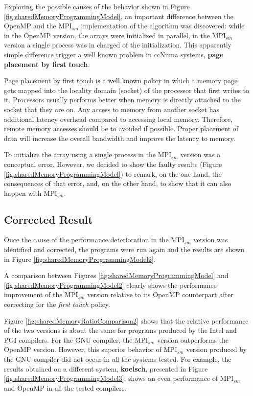Exploring the possible causes of the behavior shown in Figure \ref{fig:sharedMemoryProgrammingModel}, an important  difference between the OpenMP and the MPI$_{sm}$ implementation of the algorithm was discovered: while in the OpenMP version, the arrays were initialized in parallel, in the MPI$_{sm}$ version a single process was in charged of the initialization. This apparently simple difference trigger a well known problem in ccNuma systems, \textbf{page placement by first touch}. 

\medskip

Page placement by first touch is a well known policy in which a memory page gets mapped into the locality domain (socket) of the processor that first writes to it. Processors usually performs better when memory is directly attached to the socket that they are on. Any access to memory from another socket has additional latency overhead compared to accessing local memory. Therefore, remote memory accesses should be to avoided if possible. Proper placement of data will increase the overall bandwidth and improve the latency to memory.

\medskip

To initialize the array using a single process in the MPI$_{sm}$ version was a conceptual error. However, we decided to show the faulty results (Figure \ref{fig:sharedMemoryProgrammingModel}) to remark, on the one hand, the consequences of that error, and, on the other hand, to show that it can also happen with MPI$_{sm}$.

\subsection*{Corrected Result}

Once the cause of the performance deterioration in the MPI$_{sm}$ version was identified and corrected, the programs were run again and the results are shown in Figure \ref{fig:sharedMemoryProgrammingModel2}.

\medskip

A comparison between Figures \ref{fig:sharedMemoryProgrammingModel} and \ref{fig:sharedMemoryProgrammingModel2} clearly shows the performance improvement of the MPI$_{sm}$ version relative to its OpenMP counterpart after correcting for the \emph{first touch} policy. 

\medskip

Figure \ref{fig:sharedMemoryRatioComparison2} shows that the relative performance of the two versions is about the same for programs produced by the Intel and PGI compilers. For the GNU compiler, the MPI$_{sm}$ version outperforms the OpenMP version. However, this superior behavior of MPI$_{sm}$ version produced by the GNU compiler did not occur in all the systems tested. For example, the results obtained on a different system, \textbf{koelsch}, presented in Figure \ref{fig:sharedMemoryProgrammingModel3}, shows an even performance of MPI$_{sm}$ and OpenMP in all the tested compilers.



